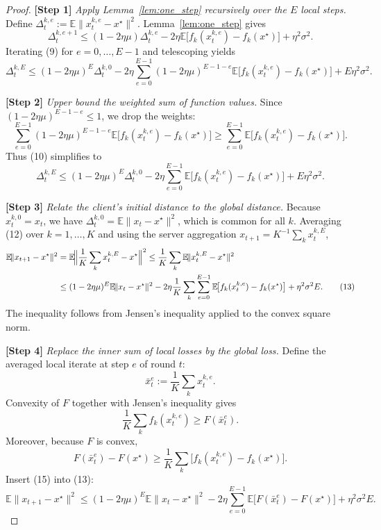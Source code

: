 \documentclass{article}
\newcommand{\E}{\mathbb{E}}
\begin{document}
\begin{proof}
\textbf{[Step 1]} \emph{Apply Lemma~\ref{lem:one_step} recursively over the $E$ local steps.}  
Define $\Delta_{t}^{k,e}:=\E\!\|x_{t}^{k,e}-x^{\star}\|^{2}$.  Lemma~\ref{lem:one_step} gives
\[
\Delta_{t}^{k,e+1}
\le (1-2\eta\mu)\Delta_{t}^{k,e}
-2\eta\E\!\bigl[f_k(x_{t}^{k,e})-f_k(x^{\star})\bigr]
+\eta^{2}\sigma^{2}. \tag{9}
\]
Iterating (9) for $e=0,\dots,E-1$ and telescoping yields
\[
\Delta_{t}^{k,E}
\le (1-2\eta\mu)^{E}\Delta_{t}^{k,0}
-2\eta\sum_{e=0}^{E-1}(1-2\eta\mu)^{E-1-e}
\E\!\bigl[f_k(x_{t}^{k,e})-f_k(x^{\star})\bigr]
+E\eta^{2}\sigma^{2}. \tag{10}
\]

\textbf{[Step 2]} \emph{Upper bound the weighted sum of function values.}  
Since $(1-2\eta\mu)^{E-1-e}\le1$, we drop the weights:
\[
\sum_{e=0}^{E-1}(1-2\eta\mu)^{E-1-e}
\E\!\bigl[f_k(x_{t}^{k,e})-f_k(x^{\star})\bigr]
\ge\sum_{e=0}^{E-1}
\E\!\bigl[f_k(x_{t}^{k,e})-f_k(x^{\star})\bigr]. \tag{11}
\]
Thus (10) simplifies to
\[
\Delta_{t}^{k,E}
\le (1-2\eta\mu)^{E}\Delta_{t}^{k,0}
-2\eta\sum_{e=0}^{E-1}
\E\!\bigl[f_k(x_{t}^{k,e})-f_k(x^{\star})\bigr]
+E\eta^{2}\sigma^{2}. \tag{12}
\]

\textbf{[Step 3]} \emph{Relate the client’s initial distance to the global distance.}  
Because $x_{t}^{k,0}=x_t$, we have $\Delta_{t}^{k,0}= \E\!\|x_t-x^{\star}\|^{2}$, which is common for all $k$.
Averaging (12) over $k=1,\dots,K$ and using the server aggregation $x_{t+1}=K^{-1}\sum_{k}x_{t}^{k,E}$,
\begin{align}
\E\!\|x_{t+1}-x^{\star}\|^{2}
&=\E\!\Bigl\|\frac1K\sum_{k}x_{t}^{k,E}-x^{\star}\Bigr\|^{2}
\le\frac1K\sum_{k}\E\!\|x_{t}^{k,E}-x^{\star}\|^{2} \nonumber\\
&\le (1-2\eta\mu)^{E}\E\!\|x_t-x^{\star}\|^{2}
-2\eta\frac1K\sum_{k}\sum_{e=0}^{E-1}
\E\!\bigl[f_k(x_{t}^{k,e})-f_k(x^{\star})\bigr]
+ \eta^{2}\sigma^{2}E. \tag{13}
\end{align}
The inequality follows from Jensen’s inequality applied to the convex square norm.

\textbf{[Step 4]} \emph{Replace the inner sum of local losses by the global loss.}  
Define the averaged local iterate at step $e$ of round $t$:
\[
\bar{x}_{t}^{e}:=\frac1K\sum_{k}x_{t}^{k,e}.
\]
Convexity of $F$ together with Jensen’s inequality gives
\[
\frac1K\sum_{k}f_k(x_{t}^{k,e})\ge F(\bar{x}_{t}^{e}). \tag{14}
\]
Moreover, because $F$ is convex,
\[
F(\bar{x}_{t}^{e})-F(x^{\star})\ge \frac1K\sum_{k}\bigl[f_k(x_{t}^{k,e})-f_k(x^{\star})\bigr]. \tag{15}
\]
Insert (15) into (13):
\[
\E\!\|x_{t+1}-x^{\star}\|^{2}
\le (1-2\eta\mu)^{E}\E\!\|x_t-x^{\star}\|^{2}
-2\eta\sum_{e=0}^{E-1}\E\!\bigl[F(\bar{x}_{t}^{e})-F(x^{\star})\bigr]
+ \eta^{2}\sigma^{2}E. \tag{16}
\]


\end{proof}
\end{document}
